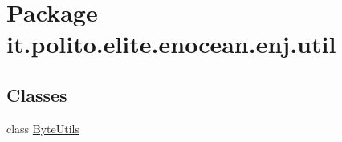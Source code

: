 \hypertarget{namespaceit_1_1polito_1_1elite_1_1enocean_1_1enj_1_1util}{}\section{Package it.\+polito.\+elite.\+enocean.\+enj.\+util}
\label{namespaceit_1_1polito_1_1elite_1_1enocean_1_1enj_1_1util}
\subsection*{Classes}
\begin{DoxyCompactItemize}
\item 
class \hyperlink{classit_1_1polito_1_1elite_1_1enocean_1_1enj_1_1util_1_1_byte_utils}{Byte\+Utils}
\end{DoxyCompactItemize}
